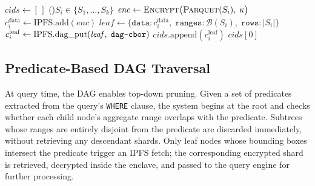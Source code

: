 \begin{algorithm}[t]
\caption{\textsc{BuildDAG}: IPLD Merkle DAG Construction}
\label{alg:dag_build}
\DontPrintSemicolon
{}
$\mathit{cids} \gets [\,]$\;
\ForEach(){$S_i \in \{S_1, \ldots, S_k\}$}{
    $\mathit{enc} \gets \textsc{Encrypt}\bigl(\textsc{Parquet}(S_i),\; \kappa\bigr)$\;
    $c_i^{\mathrm{data}} \gets \mathrm{IPFS.add}(\mathit{enc})$\;
    $\mathit{leaf} \gets \bigl\{\texttt{data}\!: c_i^{\mathrm{data}},\; \texttt{ranges}\!: \mathcal{B}(S_i),\; \texttt{rows}\!: |S_i|\bigr\}$\;
    $c_i^{\mathrm{leaf}} \gets \mathrm{IPFS.dag\_put}(\mathit{leaf},\; \texttt{dag\text{-}cbor})$\;
    $\mathit{cids}.\mathrm{append}(c_i^{\mathrm{leaf}})$\;
}
\Return $\mathit{cids}[0]$\;
\end{algorithm}
 
\subsection{Predicate-Based DAG Traversal}
\label{sec:dag_traversal}
 
At query time, the DAG enables top-down pruning. Given a set of predicates extracted from the query's \texttt{WHERE} clause, the system begins at the root and checks whether each child node's aggregate range overlaps with the predicate. Subtrees whose ranges are entirely disjoint from the predicate are discarded immediately, without retrieving any descendant shards. Only leaf nodes whose bounding boxes intersect the predicate trigger an IPFS fetch; the corresponding encrypted shard is retrieved, decrypted inside the enclave, and passed to the query engine for further processing.
 
 
